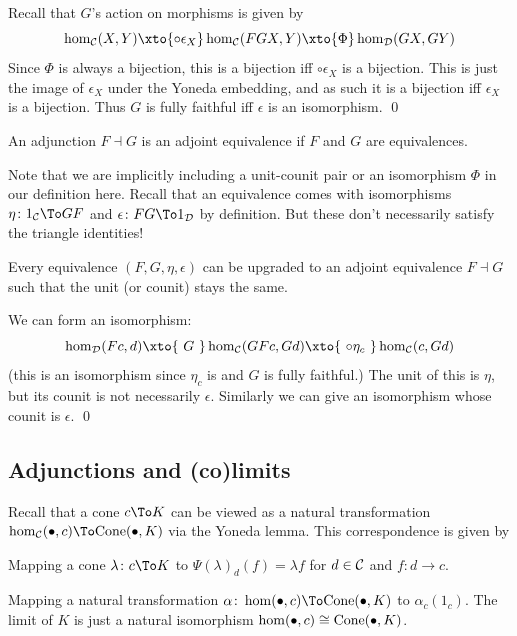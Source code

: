 \eprop

\bproof

    Recall that $G$'s action on morphisms is given by
    $$ \hom_\C(X,Y) \xto{\circ\epsilon_X} \hom_\C(FGX,Y) \xto{\Phi} \hom_\D(GX,GY) $$
    Since $\Phi$ is always a bijection, this is a bijection iff $\circ\epsilon_X$ is a bijection.
    This is just the image of $\epsilon_X$ under the Yoneda embedding, and as such it is a bijection iff $\epsilon_X$ is a bijection.
    Thus $G$ is fully faithful iff $\epsilon$ is an isomorphism.
    \qed

\eproof

\bdefn

    An adjunction $F\dashv G$ is an {\emphcolor adjoint equivalence} if $F$ and $G$ are equivalences.

\edefn

Note that we are implicitly including a unit-counit pair or an isomorphism $\Phi$ in our definition here.
Recall that an equivalence comes with isomorphisms $\eta\colon1_\C\To GF$ and $\epsilon\colon FG\To1_\D$ by definition.
But these don't necessarily satisfy the triangle identities!

\bprop

    Every equivalence $(F,G,\eta,\epsilon)$ can be upgraded to an adjoint equivalence $F\dashv G$ such that the unit (or counit) stays the same.

\eprop

\bproof

    We can form an isomorphism:
    $$ \hom_\D(Fc,d) \xto{\ G\ }\hom_\C(GFc,Gd) \xto{\ \circ\eta_c\ } \hom_\C(c,Gd) $$
    (this is an isomorphism since $\eta_c$ is and $G$ is fully faithful.)
    The unit of this is $\eta$, but its counit is not necessarily $\epsilon$.
    Similarly we can give an isomorphism whose counit is $\epsilon$.
    \qed

\eproof

\subsection{Adjunctions and (co)limits}

Recall that a cone $c\To K$ can be viewed as a natural transformation $\hom_\C(\bul,c)\To\cone(\bul,K)$ via the Yoneda lemma.
This correspondence is given by
\benum
    \item Mapping a cone $\lambda\colon c\To K$ to $\Psi(\lambda)_d(f)=\lambda f$ for $d\in{{\cal C}}$ and $f\colon d\to c$.
    \item Mapping a natural transformation $\alpha\colon\hom(\bul,c)\To\cone(\bul,K)$ to $\alpha_c(1_c)$.
\eenum
The limit of $K$ is just a natural isomorphism $\hom(\bullet,c)\cong{\rm Cone}(\bullet,K)$.

